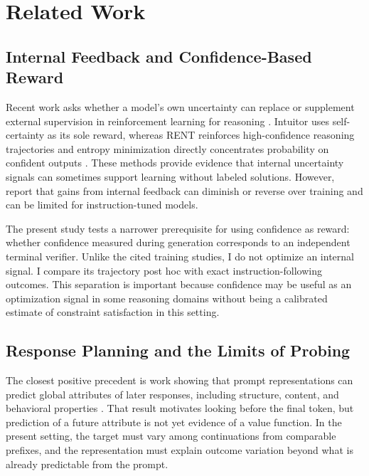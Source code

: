 \documentclass[manuscript,screen,nonacm]{acmart}
\begin{document}
\section{Related Work}

\subsection{Internal Feedback and Confidence-Based Reward}

Recent work asks whether a model's own uncertainty can replace or supplement
external supervision in reinforcement learning for reasoning
\citep{zhang2025survey}. Intuitor uses self-certainty as its sole reward,
whereas RENT reinforces high-confidence reasoning trajectories and entropy
minimization directly concentrates probability on confident outputs
\citep{zhao2025intuitor,prabhudesai2025rent,agarwal2025entropy}. These methods
provide evidence that internal uncertainty signals can sometimes support
learning without labeled solutions. However, \citet{zhang2025nofreelunch}
report that gains from internal feedback can diminish or reverse over training
and can be limited for instruction-tuned models.

The present study tests a narrower prerequisite for using confidence as reward:
whether confidence measured during generation corresponds to an independent
terminal verifier. Unlike the cited training studies, I do not optimize an
internal signal. I compare its trajectory post hoc with exact
instruction-following outcomes. This separation is important because confidence
may be useful as an optimization signal in some reasoning domains without being
a calibrated estimate of constraint satisfaction in this setting.

\subsection{Response Planning and the Limits of Probing}

The closest positive precedent is work showing that prompt representations can
predict global attributes of later responses, including structure, content,
and behavioral properties \citep{dong2025planning}. That result motivates
looking before the final token, but prediction of a future attribute is not yet
evidence of a value function. In the present setting, the target must vary among
continuations from comparable prefixes, and the representation must explain
outcome variation beyond what is already predictable from the prompt.
\end{document}
